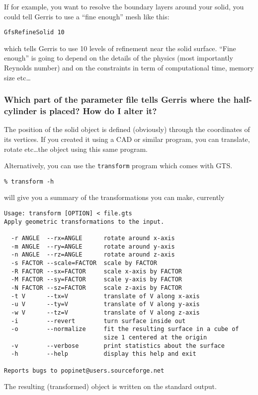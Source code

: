 \documentclass[a4paper]{article}
\begin{document}
If for example, you want to resolve the boundary layers around your
solid, you could tell Gerris to use a ``fine enough'' mesh like this:
\begin{verbatim}
GfsRefineSolid 10
\end{verbatim}
which tells Gerris to use 10 levels of refinement near the solid
surface. ``Fine enough'' is going to depend on the details of the
physics (most importantly Reynolds number) and on the constraints in
term of computational time, memory size etc\dots

\subsubsection{Which part of the parameter file tells Gerris where the
 half-cylinder is placed? How do I alter it?}

The position of the solid object is defined (obviously) through the
coordinates of its vertices. If you created it using a CAD or similar
program, you can translate, rotate etc\dots the object using this same
program.

Alternatively, you can use the {\tt transform} program which comes with
GTS.
\begin{verbatim}
% transform -h
\end{verbatim}
will give you a summary of the transformations you can make, currently
\begin{verbatim}
Usage: transform [OPTION] < file.gts
Apply geometric transformations to the input.

  -r ANGLE  --rx=ANGLE      rotate around x-axis
  -m ANGLE  --ry=ANGLE      rotate around y-axis
  -n ANGLE  --rz=ANGLE      rotate around z-axis
  -s FACTOR --scale=FACTOR  scale by FACTOR
  -R FACTOR --sx=FACTOR     scale x-axis by FACTOR
  -M FACTOR --sy=FACTOR     scale y-axis by FACTOR
  -N FACTOR --sz=FACTOR     scale z-axis by FACTOR
  -t V      --tx=V          translate of V along x-axis
  -u V      --ty=V          translate of V along y-axis
  -w V      --tz=V          translate of V along z-axis
  -i        --revert        turn surface inside out
  -o        --normalize     fit the resulting surface in a cube of
                            size 1 centered at the origin
  -v        --verbose       print statistics about the surface
  -h        --help          display this help and exit

Reports bugs to popinet@users.sourceforge.net
\end{verbatim}
The resulting (transformed) object is written on the standard output.
\end{document}
